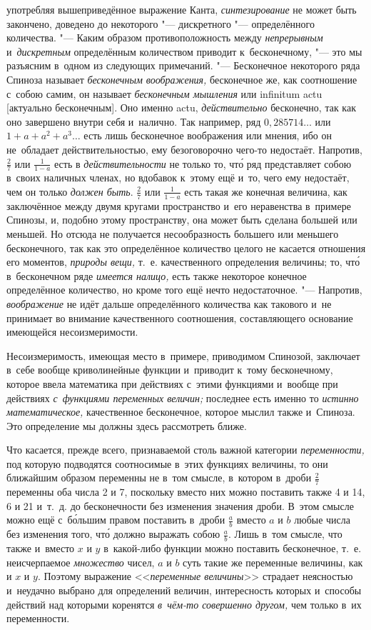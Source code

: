 употребляя вышеприведённое выражение Канта, {\em синтезирование} не может быть
закончено, доведено до некоторого "--- дискретного "--- определённого
количества. "--- Каким образом противоположность между {\em непрерывным}
и~{\em дискретным} определённым количеством приводит к~бесконечному, "--- это
мы разъясним в~одном из следующих примечаний. "--- Бесконечное некоторого ряда
Спиноза называет {\em бесконечным воображения,} бесконечное же, как соотношение
с~собою самим, он называет {\em бесконечным мышления} или infi\-ni\-tum actu
[актуально бесконечным]. Оно именно actu, {\em действительно} бесконечно, так
как оно завершено внутри себя и~налично. Так например, ряд $0{,}285714\ldots$
или $1+a+a^2+a^3\ldots$ есть лишь бесконечное воображения или мнения, ибо он
не~обладает действительностью, ему безоговорочно чего-то недостаёт. Напротив,
$\frac 2 7$ или $\frac 1{1-a}$ есть в {\em действительности} не только то, чт\'{о} ряд
представляет собою в~своих наличных членах, но вдобавок к~этому ещё и~то, чего
ему недостаёт, чем он только {\em должен быть}. $\frac 2 7$ или $\frac 1{1-a}$
есть такая же конечная величина, как заключённое между двумя кругами
пространство и~его неравенства в~примере Спинозы, и, подобно этому
пространству, она может быть сделана большей или меньшей. Но отсюда не
получается несообразность большего или меньшего бесконечного, так как это
определённое количество целого не касается отношения его моментов,
{\em природы вещи,} т.~е. качественного определения величины; то, чт\'{о} в~бесконечном
ряде {\em имеется налицо,} есть также некоторое конечное определённое количество,
но кроме того ещё нечто недостаточное. "--- Напротив, {\em воображение} не идёт
дальше определённого количества как такового и~не принимает во внимание
качественного соотношения, составляющего основание имеющейся несоизмеримости.

Несоизмеримость, имеющая место в~примере, приводимом Спинозой, заключает в~себе
вообще криволинейные функции и~приводит к~тому бесконечному, которое ввела
математика при действиях с~этими функциями и~вообще при действиях
{\em с~функциями переменных величин;} последнее есть именно то
{\em истинно математическое,} качественное бесконечное, которое мыслил
также и~Спиноза. Это определение мы должны здесь рассмотреть ближе.

Что касается, прежде всего, признаваемой столь важной категории
{\em переменности,} под которую подводятся соотносимые в~этих функциях
величины, то они ближайшим образом переменны не в~том смысле, в~котором в~дроби
$\frac 2 7$ переменны оба числа 2 и 7, поскольку вместо них можно поставить
также 4 и 14, 6 и 21 и~т.~д. до бесконечности без изменения значения дроби.
В~этом смысле можно ещё с~б\'{о}льшим правом поставить в~дроби $\frac a b$ вместо
$a$ и $b$ любые числа без изменения того, чт\'{о} должно выражать собою
$\frac a b$. Лишь в~том смысле, что также и~вместо $x$ и $y$ в~какой-либо
функции можно поставить бесконечное, т.~е. неисчерпаемое {\em множество} чисел,
$a$ и $b$ суть такие же переменные величины, как и $x$ и $y$. Поэтому выражение
<<{\em переменные величины}>> страдает неясностью и~неудачно выбрано для
определений величин, интересность которых и~способы действий над которыми
коренятся {\em в~чём-то совершенно другом,} чем только в~их переменности.


